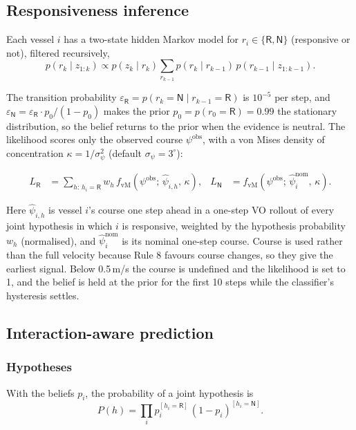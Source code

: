 \documentclass[10pt,a4paper]{article}
\newcommand{\R}{\mathsf{R}}
\newcommand{\N}{\mathsf{N}}
\begin{document}
\subsection{Responsiveness inference}\label{sec:filter}

Each vessel $i$ has a two-state hidden Markov model for $r_i\in\{\R,\N\}$ (responsive or not), filtered recursively,
\begin{equation}
  p(r_k\mid z_{1:k}) \propto p(z_k \mid r_k)\sum_{r_{k-1}} p(r_k\mid r_{k-1})\,p(r_{k-1}\mid z_{1:k-1}).
\end{equation}

The transition probability $\varepsilon_\R = p(r_k=\N\mid r_{k-1}=\R)$ is
$10^{-5}$ per step, and $\varepsilon_\N = \varepsilon_\R \cdot p_0/(1-p_0)$
makes the prior $p_0 = p(r_0=\R) = 0.99$ the stationary distribution, so the
belief returns to the prior when the evidence is neutral. The likelihood scores
only the observed course $\psi^{\text{obs}}$, with a von Mises density of
concentration $\kappa = 1/\sigma_\psi^2$ (default $\sigma_\psi = 3^\circ$):

\begin{align}
  L_\R &= \sum_{h:\,h_i=\R} w_h\, f_{\text{vM}}\!\left(\psi^{\text{obs}};\,\hat\psi_{i,h},\,\kappa\right), &
  L_\N &= f_{\text{vM}}\!\left(\psi^{\text{obs}};\,\hat\psi_{i}^{\text{nom}},\,\kappa\right).
\end{align}

Here $\hat\psi_{i,h}$ is vessel $i$'s course one step ahead in a one-step VO
rollout of every joint hypothesis in which $i$ is responsive, weighted by the
hypothesis probability $w_h$ (normalised), and $\hat\psi_i^{\text{nom}}$ is its
nominal one-step course. Course is used rather than the full velocity because
Rule 8 favours course changes, so they give the earliest signal. Below 0.5\,m/s
the course is undefined and the likelihood is set to 1, and the belief is held
at the prior for the first 10 steps while the classifier's hysteresis settles.

\subsection{Interaction-aware prediction}\label{sec:rollout}

\subsubsection{Hypotheses}
With the beliefs $p_i$, the probability of a joint hypothesis is
\begin{equation}
  P(h) = \prod_{i} p_i^{[h_i=\R]}\,(1-p_i)^{[h_i=\N]}.
\end{equation}
\end{document}
